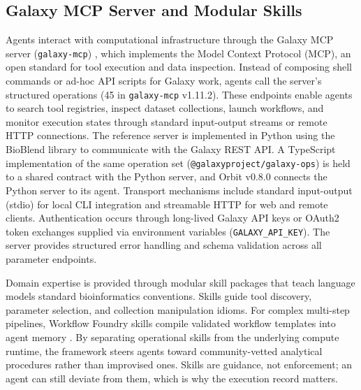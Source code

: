 \documentclass[11pt,letterpaper]{article}
\newcommand{\tool}[1]{\textsf{#1}}
\begin{document}
\subsection*{Galaxy MCP Server and Modular Skills}
Agents interact with computational infrastructure through the Galaxy MCP server (\texttt{galaxy-mcp}) \cite{galaxymcp2026}, which implements the Model Context Protocol (MCP), an open standard for tool execution and data inspection. Instead of composing shell commands or ad-hoc API scripts for Galaxy work, agents call the server's structured operations (45 in \texttt{galaxy-mcp} v1.11.2). These endpoints enable agents to search tool registries, inspect dataset collections, launch workflows, and monitor execution states through standard input-output streams or remote HTTP connections. The reference server is implemented in Python using the \tool{BioBlend} library \cite{sloggett2013bioblend} to communicate with the Galaxy REST API. A TypeScript implementation of the same operation set (\texttt{@galaxyproject/galaxy-ops}) is held to a shared contract with the Python server, and \tool{Orbit} v0.8.0 connects the Python server to its agent. Transport mechanisms include standard input-output (stdio) for local CLI integration and streamable HTTP for web and remote clients. Authentication occurs through long-lived Galaxy API keys or OAuth2 token exchanges supplied via environment variables (\texttt{GALAXY\_API\_KEY}). The server provides structured error handling and schema validation across all parameter endpoints.

Domain expertise is provided through modular skill packages \cite{galaxyskills2026} that teach language models standard bioinformatics conventions. Skills guide tool discovery, parameter selection, and collection manipulation idioms. For complex multi-step pipelines, \tool{Workflow Foundry} skills compile validated workflow templates into agent memory \cite{foundry2026}. By separating operational skills from the underlying compute runtime, the framework steers agents toward community-vetted analytical procedures rather than improvised ones. Skills are guidance, not enforcement; an agent can still deviate from them, which is why the execution record matters.
\end{document}
